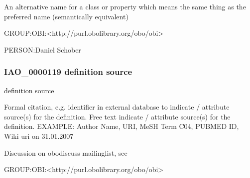 \documentclass[letterpaper,10pt,english]{sphinxmanual}
\begin{document}
\begin{sphinxShadowBox}

\sphinxAtStartPar
An alternative name for a class or property which means the same thing as the preferred name (semantically equivalent)
\end{sphinxShadowBox}

\begin{sphinxShadowBox}

\sphinxAtStartPar
GROUP:OBI:\textless{}http://purl.obolibrary.org/obo/obi\textgreater{}
\end{sphinxShadowBox}

\begin{sphinxShadowBox}

\sphinxAtStartPar
PERSON:Daniel Schober
\end{sphinxShadowBox}
\begin{quote}

\ignorespaces \end{quote}


\subsubsection{IAO\_0000119 \sphinxhyphen{} definition source}
\label{\detokenize{doc-IAO_0000119:iao-0000119-definition-source}}\label{\detokenize{doc-IAO_0000119:index-0}}\label{\detokenize{doc-IAO_0000119::doc}}
\begin{sphinxShadowBox}

\sphinxAtStartPar
definition source
\end{sphinxShadowBox}

\begin{sphinxShadowBox}

\sphinxAtStartPar
Formal citation, e.g. identifier in external database to indicate / attribute source(s) for the definition. Free text indicate / attribute source(s) for the definition. EXAMPLE: Author Name, URI, MeSH Term C04, PUBMED ID, Wiki uri on 31.01.2007
\end{sphinxShadowBox}

\begin{sphinxShadowBox}

\sphinxAtStartPar
Discussion on obo\sphinxhyphen{}discuss mailing\sphinxhyphen{}list, see 

\sphinxAtStartPar
GROUP:OBI:\textless{}http://purl.obolibrary.org/obo/obi\textgreater{}
\end{sphinxShadowBox}
\end{document}
